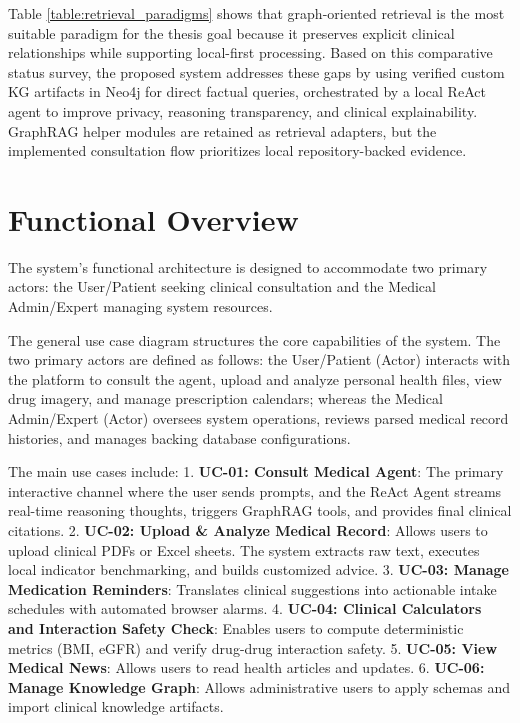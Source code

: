 \documentclass[../main.tex]{subfiles}
\begin{document}
Table \ref{table:retrieval_paradigms} shows that graph-oriented retrieval is the most suitable paradigm for the thesis goal because it preserves explicit clinical relationships while supporting local-first processing. Based on this comparative status survey, the proposed system addresses these gaps by using verified custom KG artifacts in Neo4j for direct factual queries, orchestrated by a local ReAct agent to improve privacy, reasoning transparency, and clinical explainability. GraphRAG helper modules are retained as retrieval adapters, but the implemented consultation flow prioritizes local repository-backed evidence.

\section{Functional Overview}
\label{section:2.2}
The system's functional architecture is designed to accommodate two primary actors: the User/Patient seeking clinical consultation and the Medical Admin/Expert managing system resources.

The general use case diagram structures the core capabilities of the system. The two primary actors are defined as follows: the User/Patient (Actor) interacts with the platform to consult the agent, upload and analyze personal health files, view drug imagery, and manage prescription calendars; whereas the Medical Admin/Expert (Actor) oversees system operations, reviews parsed medical record histories, and manages backing database configurations.

The main use cases include:
1. \textbf{UC-01: Consult Medical Agent}: The primary interactive channel where the user sends prompts, and the ReAct Agent streams real-time reasoning thoughts, triggers GraphRAG tools, and provides final clinical citations.
2. \textbf{UC-02: Upload \& Analyze Medical Record}: Allows users to upload clinical PDFs or Excel sheets. The system extracts raw text, executes local indicator benchmarking, and builds customized advice.
3. \textbf{UC-03: Manage Medication Reminders}: Translates clinical suggestions into actionable intake schedules with automated browser alarms.
4. \textbf{UC-04: Clinical Calculators and Interaction Safety Check}: Enables users to compute deterministic metrics (BMI, eGFR) and verify drug-drug interaction safety.
5. \textbf{UC-05: View Medical News}: Allows users to read health articles and updates.
6. \textbf{UC-06: Manage Knowledge Graph}: Allows administrative users to apply schemas and import clinical knowledge artifacts.
\end{document}
